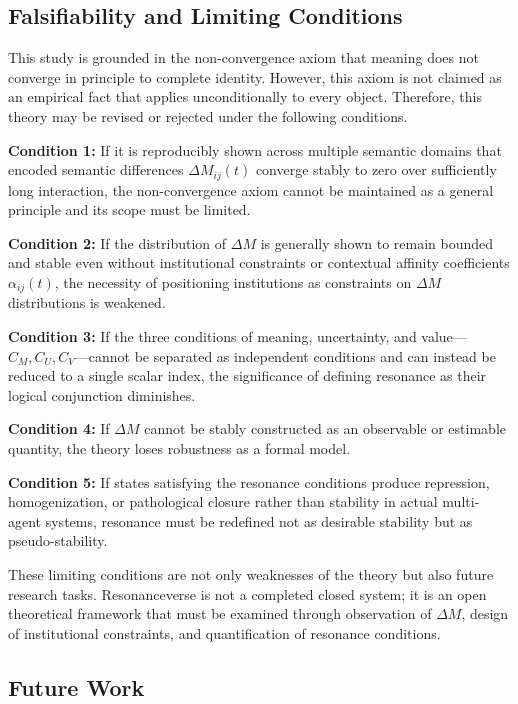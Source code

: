 \documentclass[11pt,a4paper]{article}
\theoremstyle{definition}
\begin{document}
\subsection{Falsifiability and Limiting Conditions}

This study is grounded in the non-convergence axiom that meaning does not converge in principle to complete identity. However, this axiom is not claimed as an empirical fact that applies unconditionally to every object. Therefore, this theory may be revised or rejected under the following conditions.

\textbf{Condition 1:} If it is reproducibly shown across multiple semantic domains that encoded semantic differences $\Delta M_{ij}(t)$ converge stably to zero over sufficiently long interaction, the non-convergence axiom cannot be maintained as a general principle and its scope must be limited.

\textbf{Condition 2:} If the distribution of $\Delta M$ is generally shown to remain bounded and stable even without institutional constraints or contextual affinity coefficients $\alpha_{ij}(t)$, the necessity of positioning institutions as constraints on $\Delta M$ distributions is weakened.

\textbf{Condition 3:} If the three conditions of meaning, uncertainty, and value---$C_M, C_U, C_V$---cannot be separated as independent conditions and can instead be reduced to a single scalar index, the significance of defining resonance as their logical conjunction diminishes.

\textbf{Condition 4:} If $\Delta M$ cannot be stably constructed as an observable or estimable quantity, the theory loses robustness as a formal model.

\textbf{Condition 5:} If states satisfying the resonance conditions produce repression, homogenization, or pathological closure rather than stability in actual multi-agent systems, resonance must be redefined not as desirable stability but as pseudo-stability.

These limiting conditions are not only weaknesses of the theory but also future research tasks. Resonanceverse is not a completed closed system; it is an open theoretical framework that must be examined through observation of $\Delta M$, design of institutional constraints, and quantification of resonance conditions.

\subsection{Future Work}
\end{document}
